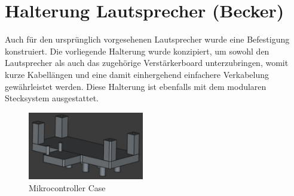 \section{Halterung Lautsprecher (Becker)}

Auch für den ursprünglich vorgesehenen Lautsprecher wurde eine Befestigung konstruiert. 
Die vorliegende Halterung wurde konzipiert, um sowohl den Lautsprecher als auch das zugehörige Verstärkerboard unterzubringen, womit kurze Kabellängen und eine damit einhergehend einfachere Verkabelung gewährleistet werden. 
Diese Halterung ist ebenfalls mit dem modularen Stecksystem ausgestattet.


\begin{figure}[ht]
    \centering
    \includegraphics[width=0.45\textwidth, keepaspectratio]{images/becker_cad_speaker.png}
    \caption{Mikrocontroller Case}
\end{figure}
